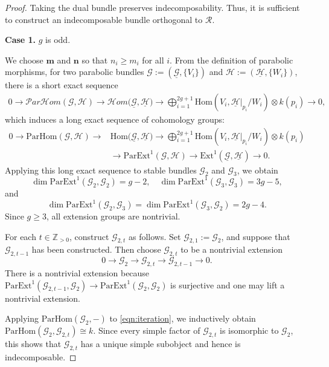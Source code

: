 \documentclass[12pt, letterpaper]{amsart}
\theoremstyle{definition}
\newcommand{\ZZ}{\mathbb{Z} }
\newcommand{\cG}{\mathcal{G} }
\newcommand{\cH}{\mathcal{H} }
\newcommand{\cR}{\mathcal{R} }
\newcommand{\bm}{\mathbf{m} }
\newcommand{\bn}{\mathbf{n} }
\newcommand{\pHom}{\mathrm{ParHom}}
\newcommand{\cpHom}{\mathcal{P}ar\cHom}
\def\rHom{\mathrm{Hom} }
\def\cHom{\mathcal{H}om }
\def\Ext{\mathrm{Ext} }
\def\pExt{\mathrm{ParExt} }
\begin{document}
\begin{proof}
Taking the dual bundle preserves indecomposability. Thus, it is sufficient to construct an indecomposable bundle orthogonal to \(\cR\).

\textbf{Case 1.} \(g\) is odd.

We choose \(\bm\) and \(\bn\) so that \(n_i \ge m_i\) for all \(i\). From the definition of parabolic morphisms, for two parabolic bundles \(\cG := (\underline{\cG}, \{V_i\})\) and \(\cH := (\underline{\cH}, \{W_i\})\), there is a short exact sequence
\begin{align}\label{eq:par_ex_seq}
0\to \cpHom(\cG,\cH)\to\cHom\bigl(\underline{\cG},\underline{\cH}\bigr)\to\bigoplus_{i=1}^{2g+1}\rHom(V_i,\underline{\cH}|_{p_i}/W_i)\otimes k(p_i)\to 0,
\end{align}
which induces a long exact sequence of cohomology groups:
\begin{equation}\label{eqn:par_long_seq}
\begin{split}
  0\to \pHom(\cG,\cH)\to&\rHom\bigl(\underline{\cG},\underline{\cH}\bigr)\to\bigoplus_{i=1}^{2g+1}\rHom(V_i,\underline{\cH}|_{p_i}/W_i)\otimes k(p_i)\\
  &\to \pExt^1(\cG, \cH) \to \Ext^1(\underline{\cG}, \underline{\cH}) \to 0.
\end{split}
\end{equation}
Applying this long exact sequence to stable bundles \(\cG_2\) and \(\cG_3\), we obtain
\[\dim \pExt^1(\cG_2, \cG_2) = g - 2, \quad \dim \pExt^1(\cG_3, \cG_3) = 3g - 5,\]
and
\[\dim \pExt^1(\cG_2, \cG_3) = \dim \pExt^1(\cG_3, \cG_2) = 2g - 4.\]
Since \(g \ge 3\), all extension groups are nontrivial.

For each \(t \in \ZZ_{>0}\), construct \(\cG_{2,t}\) as follows. Set \(\cG_{2,1}:=\cG_2\), and suppose that \(\cG_{2,t-1}\) has been constructed. Then choose \(\cG_{2,t}\) to be a nontrivial extension
\begin{equation}\label{eqn:iteration}
0 \to \cG_2 \to \cG_{2,t} \to \cG_{2,t-1} \to 0.
\end{equation}
There is a nontrivial extension because \(\pExt^1(\cG_{2,t-1},\cG_2)\to\pExt^1(\cG_2,\cG_2)\) is surjective and one may lift a nontrivial extension.

Applying \(\pHom(\cG_2,-)\) to \eqref{eqn:iteration}, we inductively obtain \(\pHom(\cG_2,\cG_{2,t})\cong k\). Since every simple factor of \(\cG_{2,t}\) is isomorphic to \(\cG_2\), this shows that \(\cG_{2,t}\) has a unique simple subobject and hence is indecomposable.


\end{proof}
\end{document}
